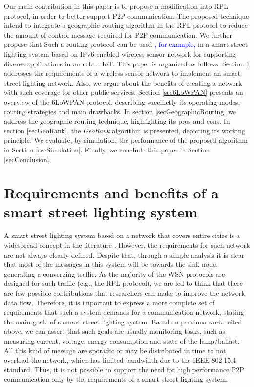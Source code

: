\documentclass[final,authoryear,3p,twocolumn]{elsarticle}
\newcommand{\removed}{\sout}
\newcommand{\rev}{\textcolor{blue}}
\begin{document}
Our main contribution in this paper is to propose a modification into RPL protocol, in order to better support P2P communication. The proposed technique intend to integrate a geographic routing algorithm in the RPL protocol to reduce the amount of control message required for P2P communication. \removed{We further propose that} Such a routing protocol can be used \rev{, for example,} in a smart street lighting system \removed{based on IPv6-enabled} wireless \removed{sensor} network for supporting diverse applications in an urban IoT. This paper is organized as follows: Section \ref{secRequirements} addresses the requirements of a wireless sensor network to implement an smart street lighting network. Also, we argue about the benefits of creating a network with such coverage for other public services. Section \ref{sec6LoWPAN} presents an overview of the 6LoWPAN protocol, describing succinctly its operating modes, routing strategies and main drawbacks. In section \ref{secGeographicRouting} we address the geographic routing technique, highlighting its pros and cons. In section \ref{secGeoRank}, the \textit{GeoRank} algorithm is presented, depicting its working principle. We evaluate, by simulation, the performance of the proposed algorithm in Section \ref{secSimulation}. Finally, we conclude this paper in Section \ref{secConclusion}.


\section{Requirements and benefits of a smart street lighting system}
\label{secRequirements}
A smart street lighting system based on a network that covers entire cities is a widespread concept in the literature \citep{Our_IAS_2009, WSN_Street_Lighting_2010_1, Cellular_Street_Lighting_2010_1, WSN_Street_Lighting_2010_2,Pantoni_2011, Pantoni_2013, daFonseca_2015}. However, the requirements for such network are not always clearly defined. Despite that, through a simple analysis it is clear that most of the messages in this system will be towards the sink node, generating a converging traffic. As the majority of the WSN protocols are designed for such traffic (e.g., the RPL protocol), we are led to think that there are few possible contributions that researchers can make to improve the network data flow. Therefore, it is important to express a more complete set of requirements that such a system demands for a communication network, stating the main goals of a smart street lighting system. Based on previous works cited above, we can assert that such goals are usually monitoring tasks, such as measuring current, voltage, energy consumption and state of the lamp/ballast. All this kind of message are sporadic or may be distributed in time to not overload the network, which has limited bandwidth due to the IEEE 802.15.4 standard. Thus, it is not possible to support the need for high performance P2P communication only by the requirements of a smart street lighting system.
\end{document}
